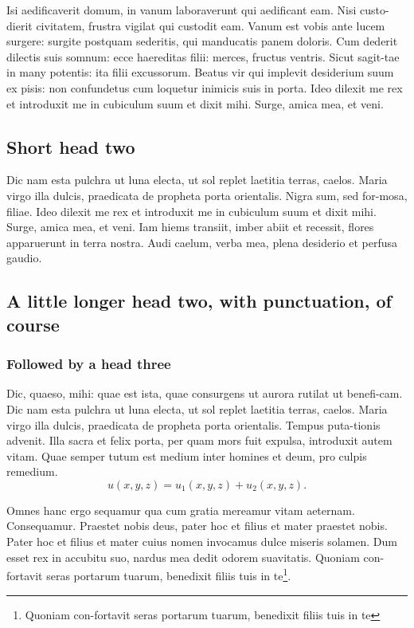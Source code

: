 \documentclass{ao2e}%
\begin{document}
Isi aedificaverit domum, in vanum laboraverunt qui aedificant eam.
Nisi custo-dierit civitatem, frustra vigilat qui custodit eam. Vanum
est vobis ante lucem surgere: surgite postquam sederitis, qui
manducatis panem doloris. Cum dederit dilectis suis somnum: ecce
haereditas filii: merces, fructus ventris. Sicut sagit-tae in many
potentis: ita filii excussorum. Beatus vir qui implevit desiderium
suum ex pisis: non confundetus cum loquetur inimicis suis in porta.
Ideo dilexit me rex et introduxit me in cubiculum suum et dixit mihi.
Surge, amica mea, et veni.

\subsection{Short head two}

Dic nam esta pulchra ut luna electa, ut sol replet laetitia terras,
caelos. Maria virgo illa dulcis, praedicata de propheta porta
orientalis. Nigra sum, sed for-mosa, filiae. Ideo dilexit me rex et
introduxit me in cubiculum suum et dixit mihi. Surge, amica mea, et
veni. Iam hiems transiit, imber abiit et recessit, flores apparuerunt in
terra nostra. Audi caelum, verba mea, plena desiderio et perfusa gaudio.

\subsection{A little longer head two, with punctuation, of course}
\subsubsection{Followed by a head three}

Dic, quaeso, mihi: quae est ista, quae consurgens ut aurora rutilat
ut benefi-cam.  Dic nam esta pulchra ut luna electa, ut sol replet
laetitia terras, caelos.  Maria virgo illa dulcis, praedicata de
propheta porta orientalis. Tempus puta-tionis advenit. Illa sacra et
felix porta, per quam mors fuit expulsa, introduxit autem vitam. Quae
semper tutum est medium inter homines et deum, pro culpis remedium.
\begin{equation}
u(x,y,z) = u_1(x,y,z) + u_2(x,y,z).
\end{equation}

Omnes hanc ergo sequamur qua cum gratia mereamur vitam aeternam.
Consequamur. Praestet nobis deus, pater hoc et filius et mater
praestet nobis.  Pater hoc et filius et mater cuius nomen invocamus
dulce miseris solamen. Dum esset rex in accubitu suo, nardus mea
dedit odorem suavitatis. Quoniam con-fortavit seras portarum tuarum,
benedixit filiis tuis in te\footnote{Quoniam con-fortavit seras portarum tuarum,
benedixit filiis tuis in te}.
\end{document}

